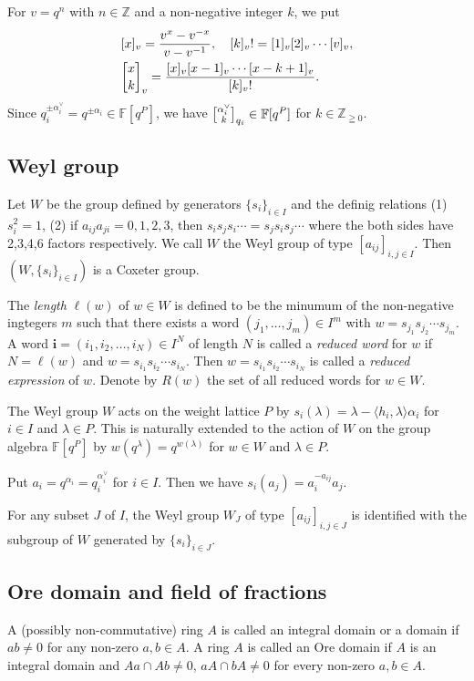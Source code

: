 \documentclass[12pt,a4paper]{article}
\newcommand\bra{\langle}
\newcommand\ket{\rangle}
\newcommand\av{\alpha^\vee}
\newcommand\ah{h}
\renewcommand\i{{\mathbf i}}
\newcommand\Z{{\mathbb Z}} %
\newcommand\F{{\mathbb F}} %
\theoremstyle{plain} %
\theoremstyle{definition} %
\theoremstyle{definition} %
\numberwithin{theorem}{section}
\numberwithin{equation}{section}
\numberwithin{figure}{section}
\numberwithin{table}{section}
\begin{document}
For $v=q^n$ with $n\in\Z$ and a non-negative integer $k$, we put
\begin{align*}
 &
 [x]_v = \frac{v^x-v^{-x}}{v-v^{-1}}, \quad
 [k]_v! = [1]_v[2]_v\cdots [v]_v, 
 \\ &
 \qbinom{x}{k}_v =
 \frac{[x]_v[x-1]_v\cdots[x-k+1]_v}{[k]_v!}.
\end{align*}
Since $q_i^{\pm\av_i}=q^{\pm\alpha_i}\in\F[q^P]$, 
we have $\qbinom{\av_i}{k}_{q_i}\in\F[q^P]$ for $k\in\Z_{\geqq0}$.

\subsection{Weyl group}

Let $W$ be the group defined by generators $\{s_i\}_{i\in I}$ 
and the definig relations (1) $s_i^2=1$, 
(2) if $a_{ij}a_{ji}=0,1,2,3$, then $s_is_js_i\cdots=s_js_is_j\cdots$ 
where the both sides have 2,3,4,6 factors respectively.
We call $W$ the Weyl group of type $[a_{ij}]_{i,j\in I}$.
Then $(W,\{s_i\}_{i\in I})$ is a Coxeter group.

The {\em length} $\ell(w)$ of $w\in W$ is defined to be 
the minumum of the non-negative ingtegers $m$ 
such that there exists a word $(j_1,\ldots,j_m)\in I^m$ 
with $w=s_{j_1}s_{j_2}\cdots s_{j_m}$.
A word $\i=(i_1,i_2,\ldots,i_N)\in I^N$ of length $N$ is 
called a {\em reduced word} for $w$ 
if $N=\ell(w)$ and $w=s_{i_1}s_{i_2}\cdots s_{i_N}$.
Then $w=s_{i_1}s_{i_2}\cdots s_{i_N}$ is called
a {\em reduced expression} of $w$.
Denote by $R(w)$ the set of all reduced words for $w\in W$.

The Weyl group $W$ acts on the weight lattice $P$ by
$s_i(\lambda) = \lambda - \bra\ah_i,\lambda\ket\alpha_i$ 
for $i\in I$ and $\lambda\in P$.
This is naturally extended to the action of $W$ on 
the group algebra $\F[q^P]$ by $w(q^\lambda)=q^{w(\lambda)}$ 
for $w\in W$ and $\lambda\in P$.

Put $a_i=q^{\alpha_i}=q_i^{\av_i}$ for $i\in I$. 
Then we have $s_i(a_j)=a_i^{-a_{ij}}a_j$.

For any subset $J$ of $I$, 
the Weyl group $W_J$ of type $[a_{ij}]_{i,j\in J}$
is identified with the subgroup of $W$ generated by $\{s_i\}_{i\in J}$.

\subsection{Ore domain and field of fractions}

A (possibly non-commutative) ring $A$ is called an integral domain 
or a domain if $ab\ne 0$ for any non-zero $a,b\in A$.
A ring $A$ is called an Ore domain 
if $A$ is an integral domain and 
$Aa\cap Ab\ne 0$, $aA\cap bA\ne 0$ for every non-zero $a,b\in A$.
\end{document}
